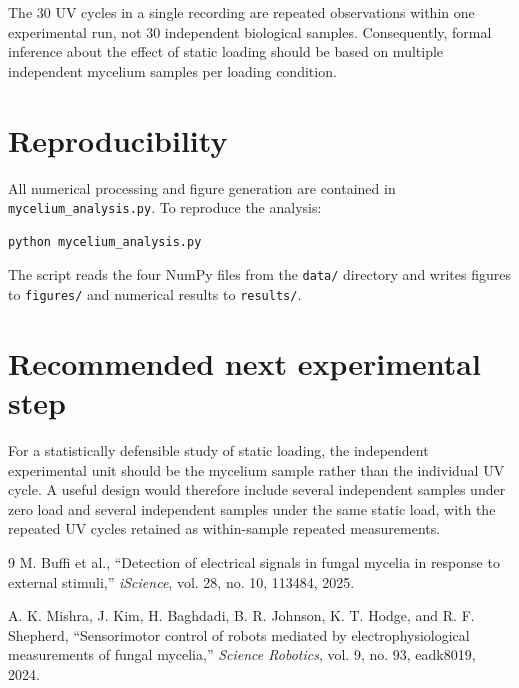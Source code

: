 \documentclass[11pt,a4paper]{article}
\begin{document}
The 30 UV cycles in a single recording are repeated observations within one
experimental run, not 30 independent biological samples. Consequently,
formal inference about the effect of static loading should be based on
multiple independent mycelium samples per loading condition.

\section{Reproducibility}

All numerical processing and figure generation are contained in
\texttt{mycelium\_analysis.py}. To reproduce the analysis:

\begin{verbatim}
python mycelium_analysis.py
\end{verbatim}

The script reads the four NumPy files from the \texttt{data/} directory and
writes figures to \texttt{figures/} and numerical results to
\texttt{results/}.

\section{Recommended next experimental step}

For a statistically defensible study of static loading, the independent
experimental unit should be the mycelium sample rather than the individual
UV cycle. A useful design would therefore include several independent
samples under zero load and several independent samples under the same
static load, with the repeated UV cycles retained as within-sample repeated
measurements.

\begin{thebibliography}{9}
M. Buffi et al., ``Detection of electrical signals in fungal mycelia in response to external stimuli,'' \emph{iScience}, vol. 28, no. 10, 113484, 2025. 

A. K. Mishra, J. Kim, H. Baghdadi, B. R. Johnson, K. T. Hodge, and R. F. Shepherd,
``Sensorimotor control of robots mediated by electrophysiological measurements of fungal mycelia,''
\emph{Science Robotics}, vol. 9, no. 93, eadk8019, 2024.
\end{thebibliography}
\end{document}
